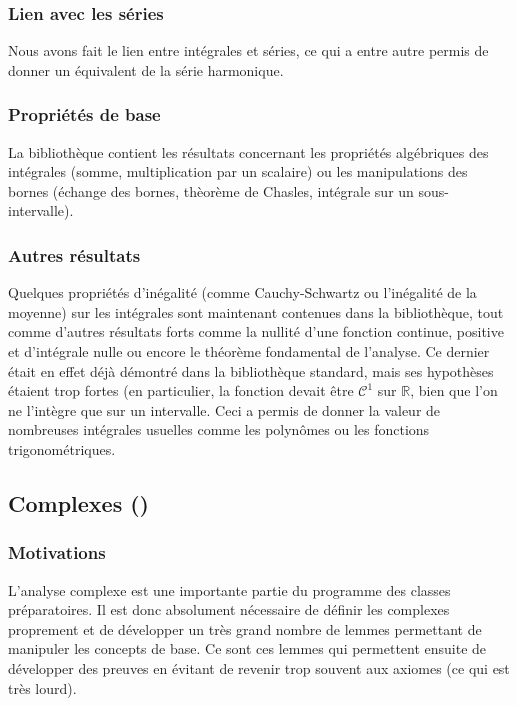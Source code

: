 	\subsubsection{Lien avec les séries}
		Nous avons fait le lien entre intégrales et séries, ce qui a entre autre permis de donner un équivalent de la série harmonique.
	
\subsubsection{Propriétés de base}
	La bibliothèque contient les résultats concernant les propriétés algébriques des intégrales (somme, multiplication par un scalaire) ou les manipulations des bornes (échange des bornes, thèorème de Chasles, intégrale sur un sous-intervalle).
	
	\subsubsection{Autres résultats}
	Quelques propriétés d'inégalité (comme Cauchy-Schwartz ou l'inégalité de la moyenne) sur les intégrales sont maintenant contenues dans la bibliothèque, tout comme d'autres résultats forts comme la nullité d'une fonction continue, positive et d'intégrale nulle ou encore le théorème fondamental de l'analyse. 
	Ce dernier était en effet déjà démontré dans la bibliothèque standard, mais ses hypothèses étaient trop fortes (en particulier, la fonction devait être $\mathcal{C}^1$ sur $\mathbb{R}$, bien que l'on ne l'intègre que sur un intervalle. Ceci a permis de donner la valeur de nombreuses intégrales usuelles comme les polynômes ou les fonctions trigonométriques.
	
\subsection{Complexes ()}


\subsubsection{Motivations}

L'analyse complexe est une importante partie du programme des classes préparatoires. Il est donc absolument nécessaire de définir les complexes proprement et de développer un très grand nombre de lemmes permettant de manipuler les concepts de base. Ce sont ces lemmes qui permettent ensuite de développer des preuves en évitant de revenir trop souvent aux axiomes (ce qui est très lourd).

